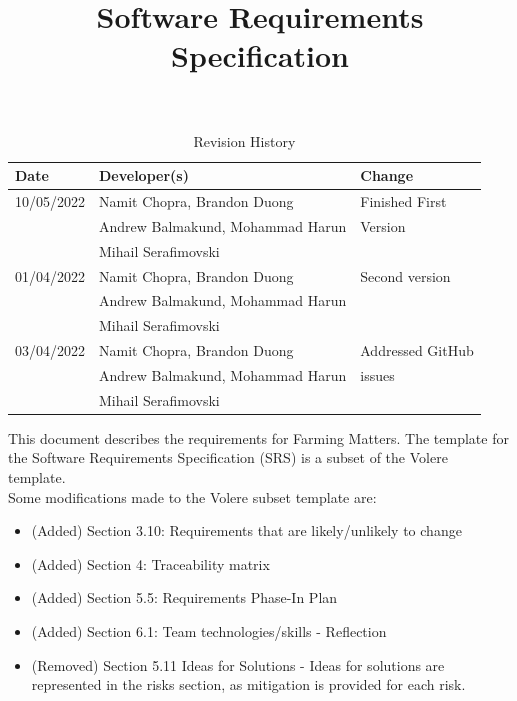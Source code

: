 \documentclass{article}
\title{Software Requirements Specification\\\progname}
\author{\authname}
\date{}
\begin{document}
\begin{table}[hp]
\caption{Revision History} \label{TblRevisionHistory}
\begin{tabularx}{\textwidth}{llX}
\toprule
\textbf{Date} & \textbf{Developer(s)} & \textbf{Change}\\
\midrule
10/05/2022 & Namit Chopra, Brandon Duong  & Finished First\\
 & Andrew Balmakund, Mohammad Harun &  Version\\
 & Mihail Serafimovski & \\
 01/04/2022 & Namit Chopra, Brandon Duong  & Second version \\
 & Andrew Balmakund, Mohammad Harun &  \\
 & Mihail Serafimovski & \\
 03/04/2022 & Namit Chopra, Brandon Duong  & Addressed GitHub \\
 & Andrew Balmakund, Mohammad Harun &  issues\\
 & Mihail Serafimovski & \\
\bottomrule
\end{tabularx}
\end{table}

\newpage

\maketitle

\newpage

\tableofcontents
\listoftables
\listoffigures

\newpage


This document describes the requirements for Farming Matters. The template for the Software
Requirements Specification (SRS) is a subset of the Volere ~\citep{RobertsonAndRobertson2012} template. \newline \\ Some modifications made to the Volere subset template are:
\begin{itemize}
    \item (Added) Section 3.10: Requirements that are likely/unlikely to change
    \item (Added) Section 4: Traceability matrix
    \item (Added) Section 5.5: Requirements Phase-In Plan
    \item (Added) Section 6.1: Team technologies/skills - Reflection
    \item (Removed) Section 5.11 Ideas for Solutions - Ideas for solutions are represented in the risks section, as mitigation is provided for each risk.
\end{itemize}
\end{document}
